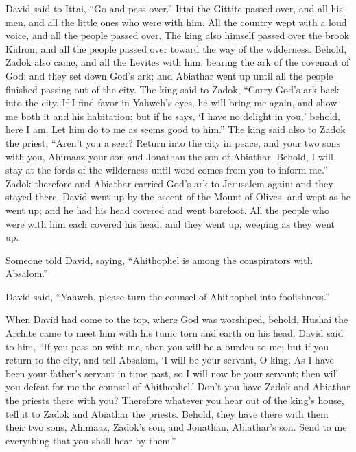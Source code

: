 David said to Ittai, ``Go and pass over.'' Ittai the
Gittite passed over, and all his men, and all the little ones who were
with him.  All the country wept with a loud voice, and all
the people passed over. The king also himself passed over the brook
Kidron, and all the people passed over toward the way of the wilderness.
 Behold, Zadok also came, and all the Levites with him,
bearing the ark of the covenant of God; and they set down God's ark; and
Abiathar went up until all the people finished passing out of the city.
 The king said to Zadok, ``Carry God's ark back into the
city. If I find favor in Yahweh's eyes, he will bring me again, and show
me both it and his habitation;  but if he says, `I have no
delight in you,' behold, here I am. Let him do to me as seems good to
him.''  The king said also to Zadok the priest, ``Aren't
you a seer? Return into the city in peace, and your two sons with you,
Ahimaaz your son and Jonathan the son of Abiathar.  Behold,
I will stay at the fords of the wilderness until word comes from you to
inform me.''  Zadok therefore and Abiathar carried God's
ark to Jerusalem again; and they stayed there.  David went
up by the ascent of the Mount of Olives, and wept as he went up; and he
had his head covered and went barefoot. All the people who were with him
each covered his head, and they went up, weeping as they went up.

 Someone told David, saying, ``Ahithophel is among the
conspirators with Absalom.''

David said, ``Yahweh, please turn the counsel of Ahithophel into
foolishness.''

 When David had come to the top, where God was worshiped,
behold, Hushai the Archite came to meet him with his tunic torn and
earth on his head.  David said to him, ``If you pass on
with me, then you will be a burden to me;  but if you
return to the city, and tell Absalom, `I will be your servant, O king.
As I have been your father's servant in time past, so I will now be your
servant; then will you defeat for me the counsel of Ahithophel.'
 Don't you have Zadok and Abiathar the priests there with
you? Therefore whatever you hear out of the king's house, tell it to
Zadok and Abiathar the priests.  Behold, they have there
with them their two sons, Ahimaaz, Zadok's son, and Jonathan, Abiathar's
son. Send to me everything that you shall hear by them.''

